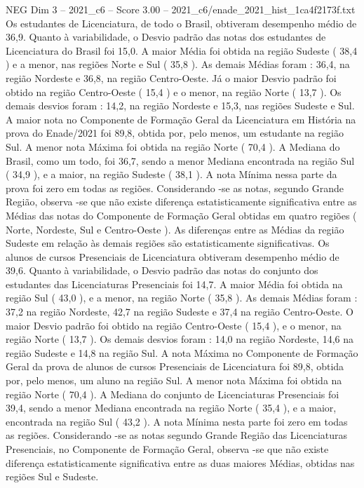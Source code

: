 \begin{textsample}{NEG Dim 3 – 2021\_c6 – Score 3.00 – 2021\_c6/enade\_2021\_hist\_1ca4f2173f.txt}
Os estudantes de Licenciatura, de todo o Brasil, obtiveram desempenho médio de 36,9.
Quanto à variabilidade, o Desvio padrão das notas dos estudantes de Licenciatura do Brasil foi 15,0.
A maior Média foi obtida na região Sudeste ( 38,4 ) e a menor, nas regiões Norte e Sul ( 35,8 ).
As demais Médias foram : 36,4, na região Nordeste e 36,8, na região Centro-Oeste.
Já o maior Desvio padrão foi obtido na região Centro-Oeste ( 15,4 ) e o menor, na região Norte ( 13,7 ).
Os demais desvios foram : 14,2, na região Nordeste e 15,3, nas regiões Sudeste e Sul.
A maior nota no Componente de Formação Geral da Licenciatura em História na prova do Enade/2021 foi 89,8, obtida por, pelo menos, um estudante na região Sul.
A menor nota Máxima foi obtida na região Norte ( 70,4 ).
A Mediana do Brasil, como um todo, foi 36,7, sendo a menor Mediana encontrada na região Sul ( 34,9 ), e a maior, na região Sudeste ( 38,1 ).
A nota Mínima nessa parte da prova foi zero em todas as regiões.
Considerando -se as notas, segundo Grande Região, observa -se que não existe diferença estatisticamente significativa entre as Médias das notas do Componente de Formação Geral obtidas em quatro regiões ( Norte, Nordeste, Sul e Centro-Oeste ).
As diferenças entre as Médias da região Sudeste em relação às demais regiões são estatisticamente significativas.
Os alunos de cursos Presenciais de Licenciatura obtiveram desempenho médio de 39,6.
Quanto à variabilidade, o Desvio padrão das notas do conjunto dos estudantes das Licenciaturas Presenciais foi 14,7.
A maior Média foi obtida na região Sul ( 43,0 ), e a menor, na região Norte ( 35,8 ).
As demais Médias foram : 37,2 na região Nordeste, 42,7 na região Sudeste e 37,4 na região Centro-Oeste.
O maior Desvio padrão foi obtido na região Centro-Oeste ( 15,4 ), e o menor, na região Norte ( 13,7 ).
Os demais desvios foram : 14,0 na região Nordeste, 14,6 na região Sudeste e 14,8 na região Sul.
A nota Máxima no Componente de Formação Geral da prova de alunos de cursos Presenciais de Licenciatura foi 89,8, obtida por, pelo menos, um aluno na região Sul.
A menor nota Máxima foi obtida na região Norte ( 70,4 ).
A Mediana do conjunto de Licenciaturas Presenciais foi 39,4, sendo a menor Mediana encontrada na região Norte ( 35,4 ), e a maior, encontrada na região Sul ( 43,2 ).
A nota Mínima nesta parte foi zero em todas as regiões.
Considerando -se as notas segundo Grande Região das Licenciaturas Presenciais, no Componente de Formação Geral, observa -se que não existe diferença estatisticamente significativa entre as duas maiores Médias, obtidas nas regiões Sul e Sudeste.

\end{textsample}
